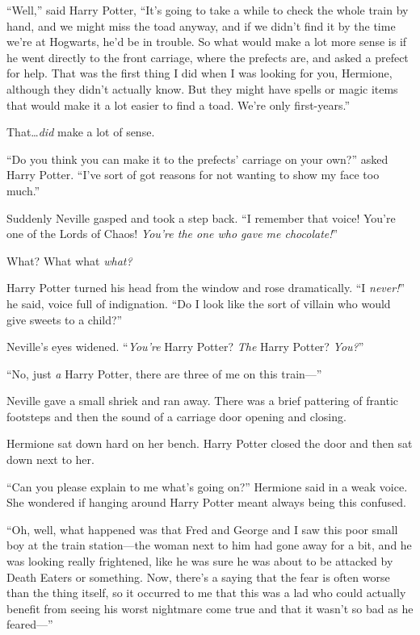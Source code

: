 “Well,” said Harry Potter, “It’s going to take a while to check the whole train by hand, and we might miss the toad anyway, and if we didn’t find it by the time we’re at Hogwarts, he’d be in trouble. So what would make a lot more sense is if he went directly to the front carriage, where the prefects are, and asked a prefect for help. That was the first thing I did when I was looking for you, Hermione, although they didn’t actually know. But they might have spells or magic items that would make it a lot easier to find a toad. We’re only first-years.”

That…\emph{did} make a lot of sense.

“Do you think you can make it to the prefects’ carriage on your own?” asked Harry Potter. “I’ve sort of got reasons for not wanting to show my face too much.”

Suddenly Neville gasped and took a step back. “I remember that voice! You’re one of the Lords of Chaos! \emph{You’re the one who gave me chocolate!}”

What? What what \emph{what?}

Harry Potter turned his head from the window and rose dramatically. “I \emph{never!}” he said, voice full of indignation. “Do I look like the sort of villain who would give sweets to a child?”

Neville’s eyes widened. “\emph{You’re} Harry Potter? \emph{The} Harry Potter? \emph{You?}”

“No, just \emph{a} Harry Potter, there are three of me on this train—”

Neville gave a small shriek and ran away. There was a brief pattering of frantic footsteps and then the sound of a carriage door opening and closing.

Hermione sat down hard on her bench. Harry Potter closed the door and then sat down next to her.

“Can you please explain to me what’s going on?” Hermione said in a weak voice. She wondered if hanging around Harry Potter meant always being this confused.

“Oh, well, what happened was that Fred and George and I saw this poor small boy at the train station—the woman next to him had gone away for a bit, and he was looking really frightened, like he was sure he was about to be attacked by Death Eaters or something. Now, there’s a saying that the fear is often worse than the thing itself, so it occurred to me that this was a lad who could actually benefit from seeing his worst nightmare come true and that it wasn’t so bad as he feared—”

